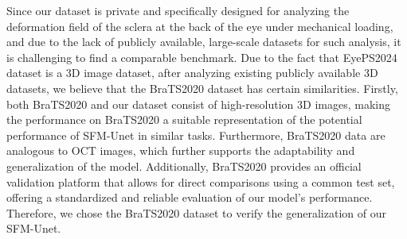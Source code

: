 \documentclass[AMA,Times1COL]{WileyNJDv5} %
\begin{document}

Since our dataset is private and specifically designed for analyzing the deformation field of the sclera at the back of the eye under mechanical loading, and due to the lack of publicly available, large-scale datasets for such analysis, it is challenging to find a comparable benchmark. Due to the fact that EyePS2024 dataset is a 3D image dataset, after analyzing existing publicly available 3D datasets, we believe that the BraTS2020 dataset has certain similarities. Firstly, both BraTS2020 and our dataset consist of high-resolution 3D images, making the performance on BraTS2020 a suitable representation of the potential performance of SFM-Unet in similar tasks. Furthermore, BraTS2020 data are analogous to OCT images, which further supports the adaptability and generalization of the model. Additionally, BraTS2020 provides an official validation platform that allows for direct comparisons using a common test set, offering a standardized and reliable evaluation of our model's performance. Therefore, we chose the BraTS2020 dataset to verify the generalization of our SFM-Unet.
\end{document}
